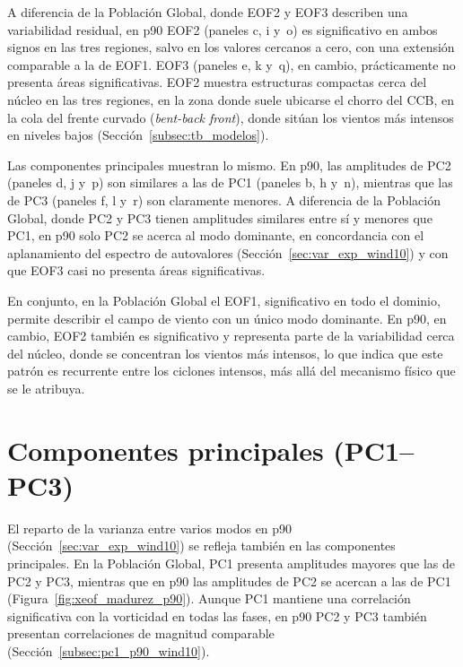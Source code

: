 A diferencia de la Población Global, donde EOF2 y EOF3 describen una variabilidad residual, en p90 EOF2 (paneles c, i y~o) es significativo en ambos signos en las tres regiones, salvo en los valores cercanos a cero, con una extensión comparable a la de EOF1. EOF3 (paneles e, k y~q), en cambio, prácticamente no presenta áreas significativas. EOF2 muestra estructuras compactas cerca del núcleo en las tres regiones, en la zona donde suele ubicarse el chorro del CCB, en la cola del frente curvado (\textit{bent-back front}), donde \citet{schemm2014linkage} sitúan los vientos más intensos en niveles bajos (Sección~\ref{subsec:tb_modelos}).

Las componentes principales muestran lo mismo. En p90, las amplitudes de PC2 (paneles d, j y~p) son similares a las de PC1 (paneles b, h y~n), mientras que las de PC3 (paneles f, l y~r) son claramente menores. A diferencia de la Población Global, donde PC2 y PC3 tienen amplitudes similares entre sí y menores que PC1, en p90 solo PC2 se acerca al modo dominante, en concordancia con el aplanamiento del espectro de autovalores (Sección~\ref{sec:var_exp_wind10}) y con que EOF3 casi no presenta áreas significativas.

En conjunto, en la Población Global el EOF1, significativo en todo el dominio, permite describir el campo de viento con un único modo dominante. En p90, en cambio, EOF2 también es significativo y representa parte de la variabilidad cerca del núcleo, donde se concentran los vientos más intensos, lo que indica que este patrón es recurrente entre los ciclones intensos, más allá del mecanismo físico que se le atribuya.

\section{Componentes principales (PC1--PC3)}\label{subsec:res_dinamica_pc1}

El reparto de la varianza entre varios modos en p90 (Sección~\ref{sec:var_exp_wind10}) se refleja también en las componentes principales. En la Población Global, PC1 presenta amplitudes mayores que las de PC2 y PC3, mientras que en p90 las amplitudes de PC2 se acercan a las de PC1 (Figura~\ref{fig:xeof_madurez_p90}). Aunque PC1 mantiene una correlación significativa con la vorticidad en todas las fases, en p90 PC2 y PC3 también presentan correlaciones de magnitud comparable (Sección~\ref{subsec:pc1_p90_wind10}).



